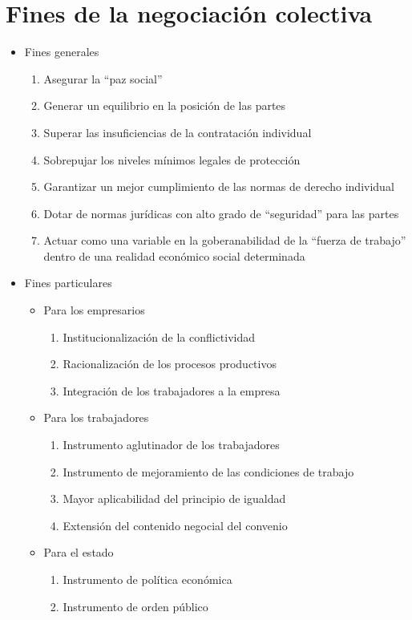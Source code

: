 \documentclass[spanish,12pt,a4paper,titlepage]{report}
\begin{document}
\section{Fines de la negociación colectiva}
\begin{itemize}
	\item Fines generales
	\begin{enumerate}
		\item Asegurar la “paz social”
		\item Generar un equilibrio en la posición de las partes
		\item Superar las insuficiencias de la contratación individual
		\item Sobrepujar los niveles mínimos legales de protección
		\item Garantizar un mejor cumplimiento de las normas de derecho individual
		\item Dotar de normas jurídicas con alto grado de “seguridad” para las partes
		\item Actuar como una variable en la goberanabilidad de la “fuerza de trabajo” dentro de una realidad económico social determinada 
	\end{enumerate}
	\item Fines particulares
	\begin{itemize}
		\item Para los empresarios
		\begin{enumerate}
			\item Institucionalización de la conflictividad
			\item Racionalización de los procesos productivos
			\item Integración de los trabajadores a la empresa
		\end{enumerate}
		\item Para los trabajadores
		\begin{enumerate}
			\item Instrumento aglutinador de los trabajadores
			\item Instrumento de mejoramiento de las condiciones de trabajo
			\item Mayor aplicabilidad del principio de igualdad 
			\item Extensión del contenido negocial del convenio 
		\end{enumerate}
		\item Para el estado
		\begin{enumerate}
			\item Instrumento de política económica
			\item Instrumento de orden público
		\end{enumerate}
	\end{itemize}
\end{itemize}
\end{document}
